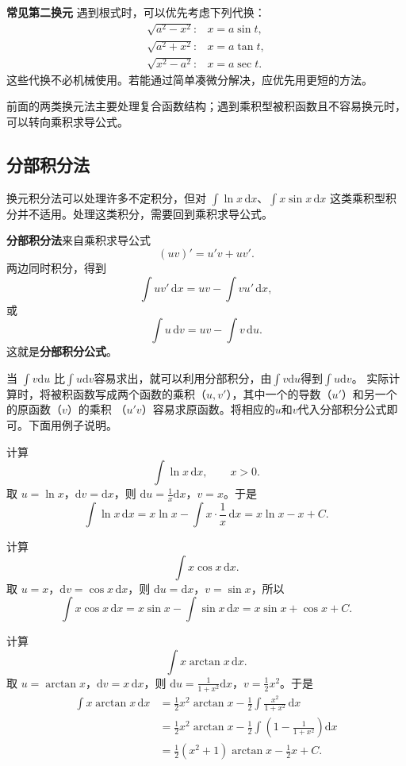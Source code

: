 \documentclass[fontset=fandol]{ctexart}
\newenvironment{custom}[1]{\par\noindent\textbf{#1}\quad}{\par\vspace{0.8em}}
\newcommand{\dd}{\mathrm{d}}
\begin{document}
\begin{custom}{常见第二换元}
遇到根式时，可以优先考虑下列代换：
\[
\begin{array}{ll}
\sqrt{a^2-x^2}: & x=a\sin t,\\[0.3em]
\sqrt{a^2+x^2}: & x=a\tan t,\\[0.3em]
\sqrt{x^2-a^2}: & x=a\sec t.
\end{array}
\]
这些代换不必机械使用。若能通过简单凑微分解决，应优先用更短的方法。
\end{custom}

前面的两类换元法主要处理复合函数结构；遇到乘积型被积函数且不容易换元时，可以转向乘积求导公式。

\subsection{分部积分法}

换元积分法可以处理许多不定积分，但对 $\int\ln x\,\dd x$、$\int x\sin x\,\dd x$ 这类乘积型积分并不适用。处理这类积分，需要回到乘积求导公式。

\textbf{分部积分法}来自乘积求导公式
\[
(uv)'=u'v+uv'.
\]
两边同时积分，得到
\[
\int u v'\,\dd x=uv-\int v u'\,\dd x,
\]
或
$$
\int u\,\dd v=uv-\int v\,\dd u.
$$
这就是\textbf{分部积分公式}。

当 $\int v \dd u$ 比$\int u \dd v$容易求出，就可以利用分部积分，由$\int v \dd u$得到$\int u \dd v$。
实际计算时，将被积函数写成两个函数的乘积（$u, v'$），其中一个的导数（$u'$）和另一个的原函数（$v$）的乘积
（$u'v$）容易求原函数。将相应的$u$和$v$代入分部积分公式即可。下面用例子说明。

\begin{example}[对数函数]
计算
\[
\int \ln x\,\dd x,\qquad x>0.
\]
取 $u=\ln x$，$\dd v=\dd x$，则 $\dd u=\frac1x\dd x$，$v=x$。于是
\[
\int\ln x\,\dd x=x\ln x-\int x\cdot\frac1x\,\dd x=x\ln x-x+C.
\]
\end{example}

\begin{example}[多项式乘三角函数]
计算
\[
\int x\cos x\,\dd x.
\]
取 $u=x$，$\dd v=\cos x\,\dd x$，则 $\dd u=\dd x$，$v=\sin x$，所以
\[
\int x\cos x\,\dd x=x\sin x-\int\sin x\,\dd x=x\sin x+\cos x+C.
\]
\end{example}

\begin{example}[反三角函数]
计算
\[
\int x\arctan x\,\dd x.
\]
取 $u=\arctan x$，$\dd v=x\,\dd x$，则 $\dd u=\frac{1}{1+x^2}\dd x$，$v=\frac12x^2$。于是
\[
\begin{aligned}
\int x\arctan x\,\dd x
&=\frac12x^2\arctan x-\frac12\int\frac{x^2}{1+x^2}\,\dd x\\
&=\frac12x^2\arctan x-\frac12\int\left(1-\frac1{1+x^2}\right)\dd x\\
&=\frac12(x^2+1)\arctan x-\frac12x+C.
\end{aligned}
\]
\end{example}
\end{document}
